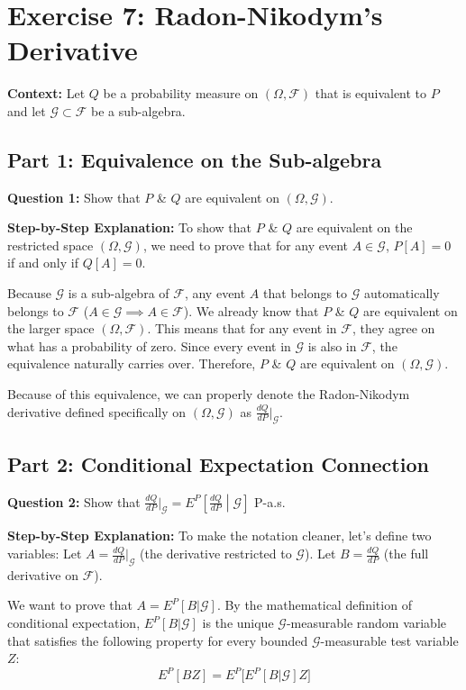 \section{Exercise 7: Radon-Nikodym's Derivative}

\textbf{Context:} Let $Q$ be a probability measure on $(\Omega, \mathcal{F})$ that is equivalent to $P$ and let $\mathcal{G} \subset \mathcal{F}$ be a sub-algebra.

\subsection{Part 1: Equivalence on the Sub-algebra}

\textbf{Question 1:} Show that $P$ \& $Q$ are equivalent on $(\Omega, \mathcal{G})$.

\textbf{Step-by-Step Explanation:}
To show that $P$ \& $Q$ are equivalent on the restricted space $(\Omega, \mathcal{G})$, we need to prove that for any event $A \in \mathcal{G}$, $P[A] = 0$ if and only if $Q[A] = 0$.

Because $\mathcal{G}$ is a sub-algebra of $\mathcal{F}$, any event $A$ that belongs to $\mathcal{G}$ automatically belongs to $\mathcal{F}$ ($A \in \mathcal{G} \implies A \in \mathcal{F}$).
We already know that $P$ \& $Q$ are equivalent on the larger space $(\Omega, \mathcal{F})$. This means that for any event in $\mathcal{F}$, they agree on what has a probability of zero.
Since every event in $\mathcal{G}$ is also in $\mathcal{F}$, the equivalence naturally carries over. Therefore, $P$ \& $Q$ are equivalent on $(\Omega, \mathcal{G})$.

Because of this equivalence, we can properly denote the Radon-Nikodym derivative defined specifically on $(\Omega, \mathcal{G})$ as $\frac{dQ}{dP}\big|_{\mathcal{G}}$.

\subsection{Part 2: Conditional Expectation Connection}

\textbf{Question 2:} Show that $\frac{dQ}{dP}\big|_{\mathcal{G}} = E^P\left[\frac{dQ}{dP} \middle| \mathcal{G}\right]$ P-a.s.

\textbf{Step-by-Step Explanation:}
To make the notation cleaner, let's define two variables:
Let $A = \frac{dQ}{dP}\big|_{\mathcal{G}}$ (the derivative restricted to $\mathcal{G}$).
Let $B = \frac{dQ}{dP}$ (the full derivative on $\mathcal{F}$).

We want to prove that $A = E^P[B | \mathcal{G}]$. 
By the mathematical definition of conditional expectation, $E^P[B | \mathcal{G}]$ is the unique $\mathcal{G}$-measurable random variable that satisfies the following property for every bounded $\mathcal{G}$-measurable test variable $Z$:
$$ E^P[B Z] = E^P\big[E^P[B | \mathcal{G}] Z\big] $$

